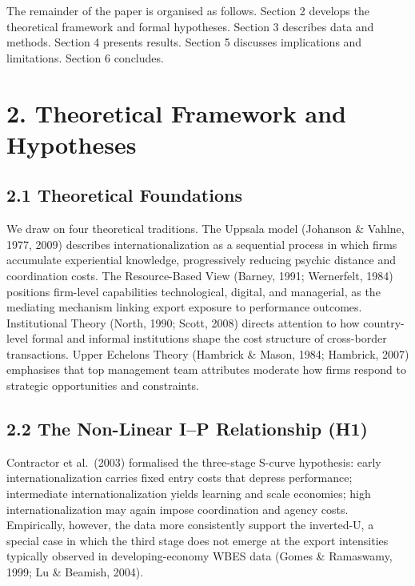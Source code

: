 \documentclass[
  12pt]{article}
\begin{document}
The remainder of the paper is organised as follows. Section 2 develops
the theoretical framework and formal hypotheses. Section 3 describes
data and methods. Section 4 presents results. Section 5 discusses
implications and limitations. Section 6 concludes.

\hypertarget{theoretical-framework-and-hypotheses}{%
\section{2. Theoretical Framework and
Hypotheses}\label{theoretical-framework-and-hypotheses}}

\hypertarget{theoretical-foundations}{%
\subsection{2.1 Theoretical Foundations}\label{theoretical-foundations}}

We draw on four theoretical traditions. The Uppsala model (Johanson \&
Vahlne, 1977, 2009) describes internationalization as a sequential
process in which firms accumulate experiential knowledge, progressively
reducing psychic distance and coordination costs. The Resource-Based
View (Barney, 1991; Wernerfelt, 1984) positions firm-level capabilities
technological, digital, and managerial, as the mediating mechanism
linking export exposure to performance outcomes. Institutional Theory
(North, 1990; Scott, 2008) directs attention to how country-level formal
and informal institutions shape the cost structure of cross-border
transactions. Upper Echelons Theory (Hambrick \& Mason, 1984; Hambrick,
2007) emphasises that top management team attributes moderate how firms
respond to strategic opportunities and constraints.

\hypertarget{the-non-linear-ip-relationship-h1}{%
\subsection{2.2 The Non-Linear I--P Relationship
(H1)}\label{the-non-linear-ip-relationship-h1}}

Contractor et al.~(2003) formalised the three-stage S-curve hypothesis:
early internationalization carries fixed entry costs that depress
performance; intermediate internationalization yields learning and scale
economies; high internationalization may again impose coordination and
agency costs. Empirically, however, the data more consistently support
the inverted-U, a special case in which the third stage does not emerge
at the export intensities typically observed in developing-economy WBES
data (Gomes \& Ramaswamy, 1999; Lu \& Beamish, 2004).
\end{document}
